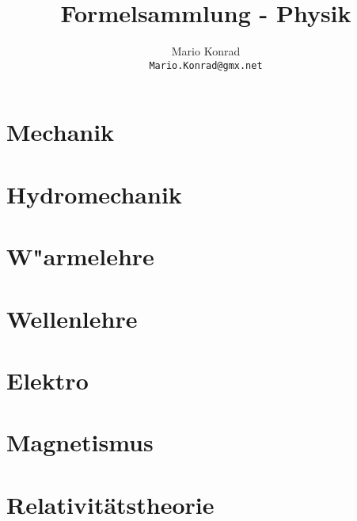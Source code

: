 \documentclass[10pt,a4paper,oneside]{article}
\begin{document}
\title{Formelsammlung - Physik}
\author{Mario Konrad\\\texttt{Mario.Konrad@gmx.net}}
\maketitle

\tableofcontents

\newpage
\part{Mechanik}


\newpage
\part{Hydromechanik}


\newpage
\part{W"armelehre}


\newpage
\part{Wellenlehre}


\newpage
\part{Elektro}


\newpage
\part{Magnetismus}


\newpage
\part{Relativit\"atstheorie}

\end{document}
